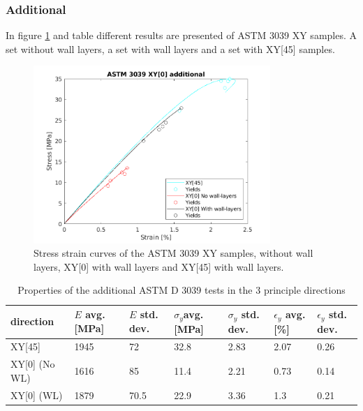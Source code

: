 \subsubsection{Additional} 
In figure \ref{fig:ASTM3039WLresults} and table \label{tab:additionalresults} different results are presented of ASTM 3039 XY samples. A set without wall layers, a set with wall layers and a set with XY[45] samples.
\begin{figure}[H]
    \centering
    \includegraphics[width=0.80\textwidth]{chapter_5_Experimentaltesting/figures/ASTMWLTensiletests.png}
    \caption{Stress strain curves of the ASTM 3039 XY samples, without wall layers, XY[0] with wall layers and XY[45] with wall layers.}
    \label{fig:ASTM3039WLresults}
\end{figure}

\begin{table}
\caption{Properties of the additional ASTM D 3039 tests in the 3 principle directions}
\begin{tabular}{ p{2.5cm}p{1cm}p{1cm}p{1cm}p{1cm}p{1cm}p{1cm}  }
 \hline
direction & $E$ avg. [MPa] & $E$ std. dev. & $\sigma_y$avg. [MPa] & $\sigma_y$ std. dev. & $\epsilon_y$ avg. [\%] & $\epsilon_y$   std. dev. \\
 \hline
XY[45] & 1945 & 72 & 32.8 & 2.83 & 2.07 & 0.26 \\
XY[0] (No WL) & 1616 & 85 & 11.4 & 2.21 & 0.73 & 0.14 \\
XY[0] (WL)& 1879 & 70.5 & 22.9 & 3.36 & 1.3 & 0.21\\
 \hline
\end{tabular}
     \label{tab:additionalresults}
     \end{table}


